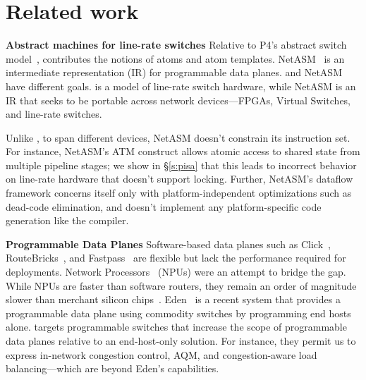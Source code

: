 \section{Related work}
\label{s:related}

\textbf{Abstract machines for line-rate switches}
Relative to P4's abstract switch model~\cite{p4}, \absmachine contributes the
notions of atoms and atom templates. NetASM~\cite{netasm} is an intermediate
representation (IR) for programmable data planes. \absmachine and NetASM have
different goals. \absmachine is a model of line-rate switch hardware, while
NetASM is an IR that seeks to be portable across network devices---FPGAs,
Virtual Switches, and line-rate switches.

Unlike \absmachine, to span different devices, NetASM doesn't constrain its
instruction set. For instance, NetASM's ATM construct allows atomic access to
shared state from multiple pipeline stages; we show in \S\ref{s:pisa} that this
leads to incorrect behavior on line-rate hardware that doesn't support locking.
Further, NetASM's dataflow framework concerns itself only with
platform-independent optimizations such as dead-code elimination, and doesn't
implement any platform-specific code generation like the \pktlanguage compiler.

\textbf{Programmable Data Planes}
Software-based data planes such as Click~\cite{click},
RouteBricks~\cite{routebricks}, and Fastpass~\cite{fastpass} are flexible but
lack the performance required for deployments. Network
Processors~\cite{ixp2800, ixp4xx} (NPUs) were an attempt to bridge the gap.
While NPUs are faster than software routers, they remain an order of magnitude
slower than merchant silicon chips~\cite{rmt}. Eden~\cite{eden} is a recent
system that provides a programmable data plane using commodity switches by
programming end hosts alone. \pktlanguage targets programmable switches that
increase the scope of programmable data planes relative to an end-host-only
solution. For instance, they permit us to express in-network congestion
control, AQM, and congestion-aware load balancing---which are beyond Eden's
capabilities.

